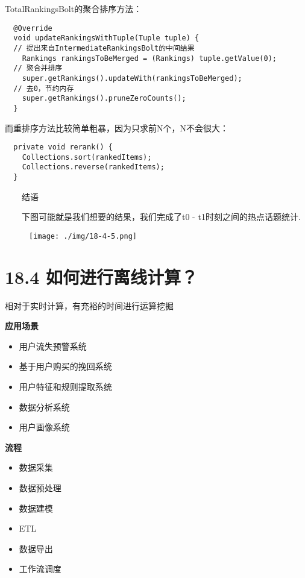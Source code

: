TotalRankingsBolt的聚合排序方法：

\begin{verbatim}
  @Override
  void updateRankingsWithTuple(Tuple tuple) {
  // 提出来自IntermediateRankingsBolt的中间结果
    Rankings rankingsToBeMerged = (Rankings) tuple.getValue(0);
  // 聚合并排序
    super.getRankings().updateWith(rankingsToBeMerged);
  // 去0，节约内存
    super.getRankings().pruneZeroCounts();
  }
\end{verbatim}

而重排序方法比较简单粗暴，因为只求前N个，N不会很大：

\begin{verbatim}
  private void rerank() {
    Collections.sort(rankedItems);
    Collections.reverse(rankedItems);
  }
\end{verbatim}

  结语

  下图可能就是我们想要的结果，我们完成了t0 - t1时刻之间的热点话题统计.

\begin{figure}
\centering
\texttt{[image: ./img/18-4-5.png]}
\caption{}
\end{figure}

\section{18.4
如何进行离线计算？}\label{ux5982ux4f55ux8fdbux884cux79bbux7ebfux8ba1ux7b97}

相对于实时计算，有充裕的时间进行运算挖掘

\textbf{应用场景}

\begin{itemize}
\item
  用户流失预警系统
\item
  基于用户购买的挽回系统
\item
  用户特征和规则提取系统
\item
  数据分析系统
\item
  用户画像系统
\end{itemize}

\textbf{流程}

\begin{itemize}
\item
  数据采集
\item
  数据预处理
\item
  数据建模
\item
  ETL
\item
  数据导出
\item
  工作流调度
\end{itemize}

